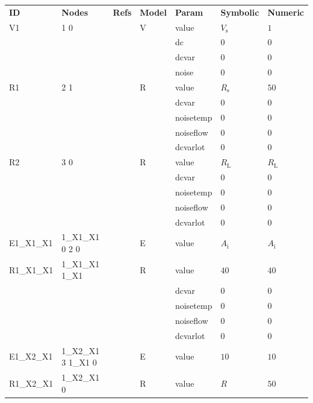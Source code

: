 \begin{table}[h]
\centering
\begin{tabular}[c]{lllllll}
\textbf{ID} & \textbf{Nodes} & \textbf{Refs} & \textbf{Model} & \textbf{Param} & \textbf{Symbolic} & \textbf{Numeric} \\ 
\rowcolor{myyellow}
\small{V1} &\small{1 0 } & &\small{V} &\small{value} &$V_{\mathrm{s}}$ &$1$ \\ 
 & & & &\small{dc} &$0$ &$0$ \\ 
\rowcolor{myyellow}
 & & & &\small{dcvar} &$0$ &$0$ \\ 
 & & & &\small{noise} &$0$ &$0$ \\ 
\rowcolor{myyellow}
\small{R1} &\small{2 1 } & &\small{R} &\small{value} &$R_{\mathrm{s}}$ &$50$ \\ 
 & & & &\small{dcvar} &$0$ &$0$ \\ 
\rowcolor{myyellow}
 & & & &\small{noisetemp} &$0$ &$0$ \\ 
 & & & &\small{noiseflow} &$0$ &$0$ \\ 
\rowcolor{myyellow}
 & & & &\small{dcvarlot} &$0$ &$0$ \\ 
\small{R2} &\small{3 0 } & &\small{R} &\small{value} &$R_{\mathrm{L}}$ &$R_{\mathrm{L}}$ \\ 
\rowcolor{myyellow}
 & & & &\small{dcvar} &$0$ &$0$ \\ 
 & & & &\small{noisetemp} &$0$ &$0$ \\ 
\rowcolor{myyellow}
 & & & &\small{noiseflow} &$0$ &$0$ \\ 
 & & & &\small{dcvarlot} &$0$ &$0$ \\ 
\rowcolor{myyellow}
\small{E1\_X1\_X1} &\small{1\_X1\_X1 0 2 0 } & &\small{E} &\small{value} &$A_{\mathrm{i}}$ &$A_{\mathrm{i}}$ \\ 
\small{R1\_X1\_X1} &\small{1\_X1\_X1 1\_X1 } & &\small{R} &\small{value} &$40$ &$40$ \\ 
\rowcolor{myyellow}
 & & & &\small{dcvar} &$0$ &$0$ \\ 
 & & & &\small{noisetemp} &$0$ &$0$ \\ 
\rowcolor{myyellow}
 & & & &\small{noiseflow} &$0$ &$0$ \\ 
 & & & &\small{dcvarlot} &$0$ &$0$ \\ 
\rowcolor{myyellow}
\small{E1\_X2\_X1} &\small{1\_X2\_X1 3 1\_X1 0 } & &\small{E} &\small{value} &$10$ &$10$ \\ 
\small{R1\_X2\_X1} &\small{1\_X2\_X1 0 } & &\small{R} &\small{value} &$R$ &$50$ \\ 

\end{tabular}
\end{table}
